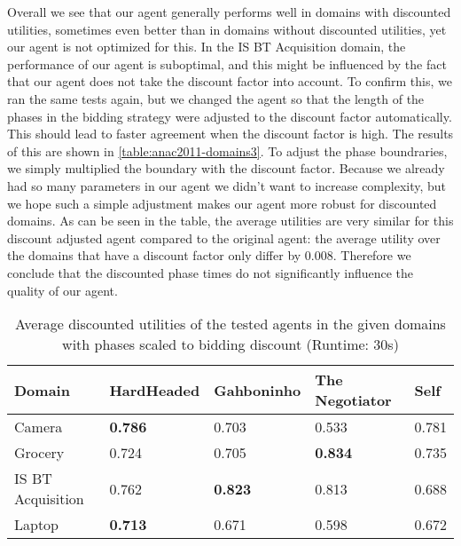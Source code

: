 Overall we see that our agent generally performs well in domains with discounted utilities, sometimes even better than in domains without discounted utilities, yet our agent is not optimized for this. In the IS BT Acquisition domain, the performance of our agent is suboptimal, and this might be influenced by the fact that our agent does not take the discount factor into account.
To confirm this, we ran the same tests again, but we changed the agent so that the length of the phases in the bidding strategy were adjusted to the discount factor automatically. This should lead to faster agreement when the discount factor is high. 
The results of this are shown in \autoref{table:anac2011-domains3}. 
To adjust the phase boundraries, we simply multiplied the boundary with the discount factor.
Because we already had so many parameters in our agent we didn't want to increase complexity, but we hope such a simple adjustment makes our agent more robust for discounted domains.
As can be seen in the table, the average utilities are very similar for this discount adjusted agent compared to the original agent: the average utility over the domains that have a discount factor only differ by 0.008. Therefore we conclude that the discounted phase times do not significantly influence the quality of our agent.

\begin{table}[H]
  \centering
  \small
  \begin{tabular}{lp{2.5cm}p{2.5cm}p{2.5cm}p{2.5cm}}
      \toprule
    Domain & HardHeaded & Gahboninho & The Negotiator & Self \\
    \midrule
	Camera & \textbf{0.786} & 0.703 & 0.533 & 0.781 \\
	Grocery & 0.724 & 0.705 & \textbf{0.834} & 0.735 \\
	IS BT Acquisition & 0.762 & \textbf{0.823} & 0.813 & 0.688 \\
	Laptop & \textbf{0.713} & 0.671 & 0.598 & 0.672 \\
   \bottomrule
  \end{tabular}
  \caption{Average discounted utilities of the tested agents in the given domains with phases scaled to bidding discount (Runtime: $30$s) \label{table:anac2011-domains3}}
\end{table}
